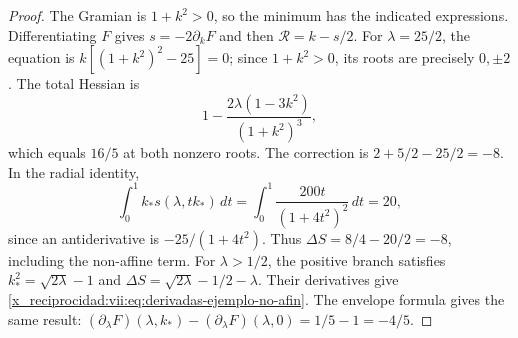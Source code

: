 \begin{proof}
The Gramian is \(1+k^2>0\), so the minimum has the
indicated expressions. Differentiating \(F\) gives
\(s=-2\partial_kF\) and then \(\mathcal R=k-s/2\).
For \(\lambda=25/2\), the equation is
\(k[(1+k^2)^2-25]=0\); since \(1+k^2>0\), its roots
are precisely \(0,\pm2\). The total Hessian is
\[
 1-\frac{2\lambda(1-3k^2)}{(1+k^2)^3},
\]
which equals \(16/5\) at both nonzero roots. The correction is
\(2+5/2-25/2=-8\). In the radial identity,
\[
 \int_0^1 k_*s(\lambda,tk_*)\,dt
    =\int_0^1\frac{200t}{(1+4t^2)^2}\,dt=20,
\]
since an antiderivative is \(-25/(1+4t^2)\).
Thus \(\Delta S=8/4-20/2=-8\), including the non-affine term.
For \(\lambda>1/2\), the positive branch satisfies
\(k_*^2=\sqrt{2\lambda}-1\) and
\(\Delta S=\sqrt{2\lambda}-1/2-\lambda\).
Their derivatives give \eqref{x_reciprocidad:vii:eq:derivadas-ejemplo-no-afin}.
The envelope formula gives the same result:
\((\partial_\lambda F)(\lambda,k_*)
 -(\partial_\lambda F)(\lambda,0)=1/5-1=-4/5\).
\end{proof}




